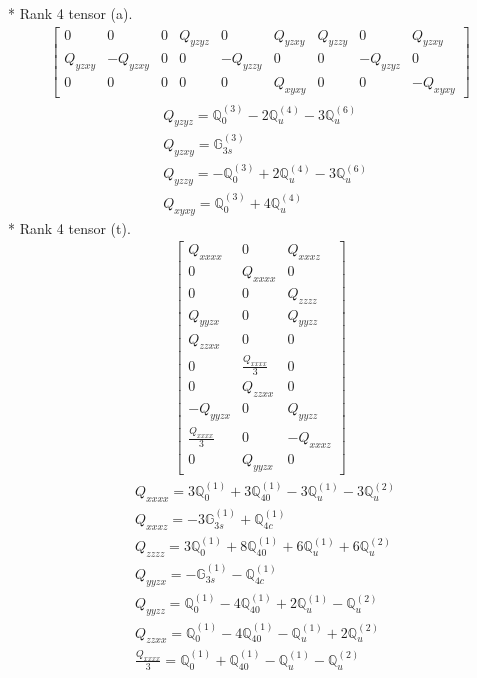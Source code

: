 \documentclass[fleqn,8pt,landscape]{jsarticle}
\begin{document}
* Rank 4 tensor (a).
\begin{align*}
\begin{bmatrix} 0 & 0 & 0 & Q_{yzyz} & 0 & Q_{yzxy} & Q_{yzzy} & 0 & Q_{yzxy} \\ Q_{yzxy} & - Q_{yzxy} & 0 & 0 & - Q_{yzzy} & 0 & 0 & - Q_{yzyz} & 0 \\ 0 & 0 & 0 & 0 & 0 & Q_{xyxy} & 0 & 0 & - Q_{xyxy} \end{bmatrix}
\end{align*}
\begin{align*}
& Q_{yzyz} = \mathbb{Q}_{0}^{(3)} - 2 \mathbb{Q}_{u}^{(4)} - 3 \mathbb{Q}_{u}^{(6)} \\
& Q_{yzxy} = \mathbb{G}_{3s}^{(3)} \\
& Q_{yzzy} = - \mathbb{Q}_{0}^{(3)} + 2 \mathbb{Q}_{u}^{(4)} - 3 \mathbb{Q}_{u}^{(6)} \\
& Q_{xyxy} = \mathbb{Q}_{0}^{(3)} + 4 \mathbb{Q}_{u}^{(4)}
\end{align*}
* Rank 4 tensor (t).
\begin{align*}
\begin{bmatrix} Q_{xxxx} & 0 & Q_{xxxz} \\ 0 & Q_{xxxx} & 0 \\ 0 & 0 & Q_{zzzz} \\ Q_{yyzx} & 0 & Q_{yyzz} \\ Q_{zzxx} & 0 & 0 \\ 0 & \frac{Q_{xxxx}}{3} & 0 \\ 0 & Q_{zzxx} & 0 \\ - Q_{yyzx} & 0 & Q_{yyzz} \\ \frac{Q_{xxxx}}{3} & 0 & - Q_{xxxz} \\ 0 & Q_{yyzx} & 0 \end{bmatrix}
\end{align*}
\begin{align*}
& Q_{xxxx} = 3 \mathbb{Q}_{0}^{(1)} + 3 \mathbb{Q}_{40}^{(1)} - 3 \mathbb{Q}_{u}^{(1)} - 3 \mathbb{Q}_{u}^{(2)} \\
& Q_{xxxz} = - 3 \mathbb{G}_{3s}^{(1)} + \mathbb{Q}_{4c}^{(1)} \\
& Q_{zzzz} = 3 \mathbb{Q}_{0}^{(1)} + 8 \mathbb{Q}_{40}^{(1)} + 6 \mathbb{Q}_{u}^{(1)} + 6 \mathbb{Q}_{u}^{(2)} \\
& Q_{yyzx} = - \mathbb{G}_{3s}^{(1)} - \mathbb{Q}_{4c}^{(1)} \\
& Q_{yyzz} = \mathbb{Q}_{0}^{(1)} - 4 \mathbb{Q}_{40}^{(1)} + 2 \mathbb{Q}_{u}^{(1)} - \mathbb{Q}_{u}^{(2)} \\
& Q_{zzxx} = \mathbb{Q}_{0}^{(1)} - 4 \mathbb{Q}_{40}^{(1)} - \mathbb{Q}_{u}^{(1)} + 2 \mathbb{Q}_{u}^{(2)} \\
& \frac{Q_{xxxx}}{3} = \mathbb{Q}_{0}^{(1)} + \mathbb{Q}_{40}^{(1)} - \mathbb{Q}_{u}^{(1)} - \mathbb{Q}_{u}^{(2)}
\end{align*}
\end{document}
